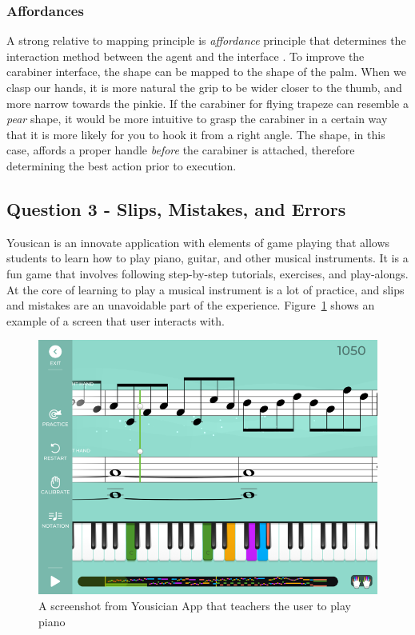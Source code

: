 \documentclass[12pt,letterpaper]{article}
\begin{document}
\subsubsection*{Affordances}
A strong relative to mapping principle is \textit{affordance} principle that determines the interaction method between the agent and the interface \cite{norman2013design}. To improve the carabiner interface, the shape can be mapped to the shape of the palm. When we clasp our hands, it is more natural the grip to be wider closer to the thumb, and more narrow towards the pinkie. If the carabiner for flying trapeze can resemble a \textit{pear} shape, it would be more intuitive to grasp the carabiner in a certain way that it is more likely for you to hook it from a right angle. The shape, in this case, affords a proper handle \textit{before} the carabiner is attached, therefore determining the best action prior to execution.


\subsection*{Question 3 - Slips, Mistakes, and Errors}
Yousican is an innovate application with elements of game playing that allows students to learn how to play piano, guitar, and other musical instruments\cite{eli2017yousician}. It is a fun game that involves following step-by-step tutorials, exercises, and play-alongs. At the core of learning to play a musical instrument is a lot of practice, and slips and mistakes are an unavoidable part of the experience. Figure~\ref{fig::2} shows an example of a screen that user interacts with.

\begin{figure}[h]
\centering
\includegraphics[scale=.35]{figures/p3/yousician.png}
\caption{A screenshot from Yousician App that teachers the user to play piano}
\label{fig::2}
\end{figure}
\end{document}
